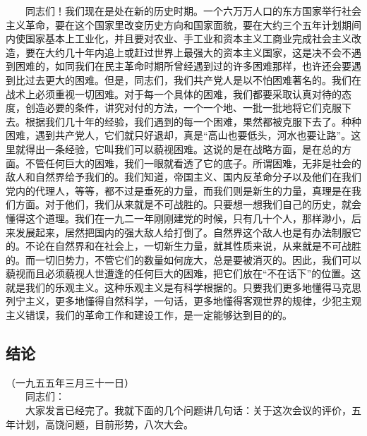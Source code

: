 \documentclass[cn,11pt,chinese]{elegantbook}
\def\myformat#1{\hfil\hfil #1}
\begin{document}
　　同志们！我们现在是处在新的历史时期。一个六万万人口的东方国家举行社会主义革命，要在这个国家里改变历史方向和国家面貌，要在大约三个五年计划期间内使国家基本上工业化，并且要对农业、手工业和资本主义工商业完成社会主义改造，要在大约几十年内追上或赶过世界上最强大的资本主义国家，这是决不会不遇到困难的，如同我们在民主革命时期所曾经遇到过的许多困难那样，也许还会要遇到比过去更大的困难。但是，同志们，我们共产党人是以不怕困难著名的。我们在战术上必须重视一切困难。对于每一个具体的困难，我们都要采取认真对待的态度，创造必要的条件，讲究对付的方法，一个一个地、一批一批地将它们克服下去。根据我们几十年的经验，我们遇到的每一个困难，果然都被克服下去了。种种困难，遇到共产党人，它们就只好退却，真是“高山也要低头，河水也要让路”。这里就得出一条经验，它叫我们可以藐视困难。这说的是在战略方面，是在总的方面。不管任何巨大的困难，我们一眼就看透了它的底子。所谓困难，无非是社会的敌人和自然界给予我们的。我们知道，帝国主义、国内反革命分子以及他们在我们党内的代理人，等等，都不过是垂死的力量，而我们则是新生的力量，真理是在我们方面。对于他们，我们从来就是不可战胜的。只要想一想我们自己的历史，就会懂得这个道理。我们在一九二一年刚刚建党的时候，只有几十个人，那样渺小，后来发展起来，居然把国内的强大敌人给打倒了。自然界这个敌人也是有办法制服它的。不论在自然界和在社会上，一切新生力量，就其性质来说，从来就是不可战胜的。而一切旧势力，不管它们的数量如何庞大，总是要被消灭的。因此，我们可以藐视而且必须藐视人世遭逢的任何巨大的困难，把它们放在“不在话下”的位置。这就是我们的乐观主义。这种乐观主义是有科学根据的。只要我们更多地懂得马克思列宁主义，更多地懂得自然科学，一句话，更多地懂得客观世界的规律，少犯主观主义错误，我们的革命工作和建设工作，是一定能够达到目的的。\\
\subsection*{\myformat{结论}}
（一九五五年三月三十一日）\\
　　同志们：\\
　　大家发言已经完了。我就下面的几个问题讲几句话：关于这次会议的评价，五年计划，高饶问题，目前形势，八次大会。\\
\end{document}
